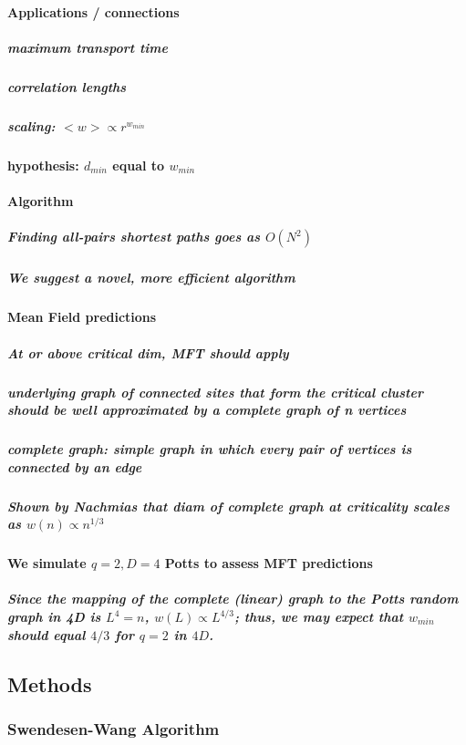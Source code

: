 \documentclass[pre,preprint]{revtex4-1}
\begin{document}
\paragraph{Applications / connections}
\label{sec-1.1.3.2}
\subparagraph{maximum transport time}
\label{sec-1.1.3.2.1}
\subparagraph{correlation lengths}
\label{sec-1.1.3.2.2}
\subparagraph{scaling: $< w > \propto r^{w_{min}}$}
\label{sec-1.1.3.2.3}
\paragraph{hypothesis: $d_{min}$ equal to $w_{min}$}
\label{sec-1.1.3.3}
\paragraph{Algorithm}
\label{sec-1.1.3.4}
\subparagraph{Finding all-pairs shortest paths goes as $O(N^2)$}
\label{sec-1.1.3.4.1}
\subparagraph{We suggest a novel, more efficient algorithm}
\label{sec-1.1.3.4.2}
\paragraph{Mean Field predictions}
\label{sec-1.1.3.5}
\subparagraph{At or above critical dim, MFT should apply}
\label{sec-1.1.3.5.1}
\subparagraph{underlying graph of connected sites that form the critical cluster should be well approximated by a complete graph of n vertices}
\label{sec-1.1.3.5.2}
\subparagraph{complete graph:  simple graph in which every pair of vertices is connected by an edge}
\label{sec-1.1.3.5.3}
\subparagraph{Shown by Nachmias \cite{Nachmiasa} that diam of complete graph at criticality scales as $w(n) \propto n^{1/3}$}
\label{sec-1.1.3.5.4}
\paragraph{We simulate $q=2, D=4$ Potts to assess MFT predictions}
\label{sec-1.1.3.6}
\subparagraph{Since the mapping of the complete (linear) graph to the Potts random graph in 4D is $L^4=n$, $w(L) \propto L^{4/3}$; thus, we may expect that $w_{min}$ should equal $4/3$ for $q=2$ in $4D$.}
\label{sec-1.1.3.6.1}
\subsection{Methods}
\label{sec-1.2}
\subsubsection{Swendesen-Wang Algorithm}
\label{sec-1.2.1}
\end{document}
